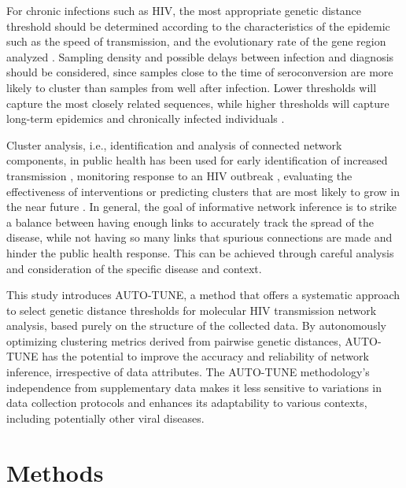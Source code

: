 \documentclass[utf8]{FrontiersinHarvard} %
\begin{document}
For chronic infections such as HIV, the most appropriate genetic distance
threshold should be determined according to the characteristics of the epidemic
such as the speed of transmission, and the evolutionary rate of the gene region
analyzed \citep{liu_dynamics_2020}. Sampling density and possible delays
between infection and diagnosis should be considered, since samples close to
the time of seroconversion are more likely to cluster than samples from well
after infection. Lower thresholds will capture the most closely related
sequences, while higher thresholds will capture long-term epidemics and
chronically infected individuals \citep{junqueira_factors_2019}.

Cluster analysis, i.e., identification and analysis of connected network
components, in public health has been used for early identification of
increased transmission \citep{oster_hiv_2021, oster_identifying_2018},
monitoring response to an HIV outbreak \citep{tumpney_human_2020,
	sizemore_using_2020, tookes_rapid_2020}, evaluating the effectiveness of
interventions \citep{peters_hiv_2016,wang_targeting_2015,liu_dynamics_2020} or
predicting clusters that are most likely to grow in the near future
\citep{erly_predictive_2021,ragonnet-cronin_forecasting_2022}. In general, the
goal of informative network inference is to strike a balance between having
enough links to accurately track the spread of the disease, while not having so
many links that spurious connections are made and hinder the public health
response. This can be achieved through careful analysis and consideration of
the specific disease and context.

This study introduces AUTO-TUNE, a method that offers a systematic
approach to select genetic distance thresholds for molecular HIV transmission
network analysis, based purely on the structure of the collected data. By
autonomously optimizing clustering metrics derived from pairwise genetic
distances, AUTO-TUNE has the potential to improve the accuracy and reliability
of network inference, irrespective of data attributes. The AUTO-TUNE
methodology's independence from supplementary data makes it less sensitive to
variations in data collection protocols and enhances its adaptability to
various contexts, including potentially other viral diseases.

\section{Methods}
\end{document}
